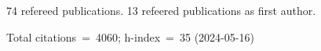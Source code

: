 74 refereed publications. 13 refeered publications as first author.

Total citations~=~4060; h-index~=~35 (2024-05-16)